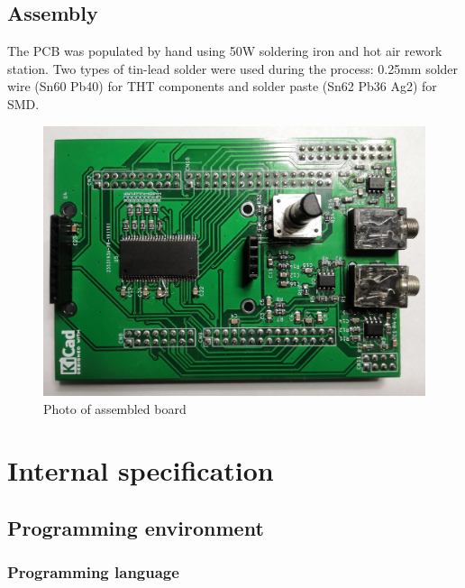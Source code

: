 \documentclass[a4paper,twoside,12pt]{book}
\begin{document}
\section{Assembly}
The PCB was populated by hand using 50W soldering iron and hot air rework station.
Two types of tin-lead solder were used during the process:
0.25mm solder wire (Sn60 Pb40) for THT components and solder paste (Sn62 Pb36 Ag2) for SMD.

\begin{figure}[H]
    \centering
    \includegraphics[width=\textwidth]{images/photo_assembled}
    \caption{Photo of assembled board}
    \label{fig:pgoto_assembled}
\end{figure}



\chapter{Internal specification}

\section{Programming environment}

\subsection{Programming language}
\end{document}
